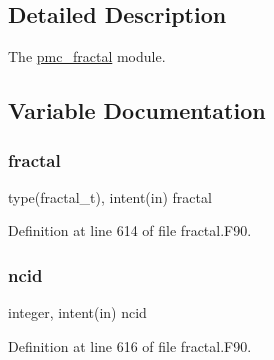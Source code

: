 \subsection{Detailed Description}
The \mbox{\hyperlink{namespacepmc__fractal}{pmc\+\_\+fractal}} module. 



\subsection{Variable Documentation}
\mbox{\label{fractal_8_f90_a949ba7f6f3ce672ed686152acedb28bf}} 
\subsubsection{\texorpdfstring{fractal}{fractal}}
{\footnotesize\ttfamily type(fractal\+\_\+t), intent(in) fractal}



Definition at line 614 of file fractal.\+F90.

\mbox{\label{fractal_8_f90_a4e89f3f850921ff84a6dfce8b166ad50}} 
\subsubsection{\texorpdfstring{ncid}{ncid}}
{\footnotesize\ttfamily integer, intent(in) ncid}



Definition at line 616 of file fractal.\+F90.

